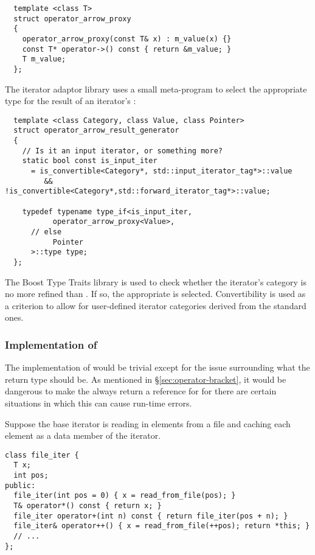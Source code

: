 \documentclass{netobjectdays}
\begin{document}
{\footnotesize
\begin{verbatim}
  template <class T>
  struct operator_arrow_proxy
  {
    operator_arrow_proxy(const T& x) : m_value(x) {}
    const T* operator->() const { return &m_value; }
    T m_value;
  };
\end{verbatim}
}

\noindent The iterator adaptor library uses a small meta-program to
select the appropriate type for the result of an iterator's
:

{\footnotesize
\begin{verbatim}
  template <class Category, class Value, class Pointer>
  struct operator_arrow_result_generator
  {
    // Is it an input iterator, or something more?
    static bool const is_input_iter
      = is_convertible<Category*, std::input_iterator_tag*>::value
         && !is_convertible<Category*,std::forward_iterator_tag*>::value;

    typedef typename type_if<is_input_iter,
           operator_arrow_proxy<Value>,
      // else
           Pointer
      >::type type;
  };
\end{verbatim}
}

The Boost Type Traits library is used to check whether the iterator's
category is no more refined than . If so,
the appropriate  is selected.
Convertibility is used as a criterion to allow for user-defined
iterator categories derived from the standard ones.


\subsubsection{Implementation of }
\label{sec:op-bracket-impl}

The implementation of  would be trivial except for
the issue surrounding what the return type should be.  As mentioned in
\S\ref{sec:operator-bracket}, it would be dangerous to make the
 always return a reference for
 for there are certain situations in which this can
cause run-time errors.

Suppose the base iterator is reading in elements from a file and
caching each element as a data member of the iterator.

{\footnotesize
\begin{verbatim}
class file_iter {
  T x;
  int pos;
public:
  file_iter(int pos = 0) { x = read_from_file(pos); }
  T& operator*() const { return x; }
  file_iter operator+(int n) const { return file_iter(pos + n); }
  file_iter& operator++() { x = read_from_file(++pos); return *this; }
  // ...
};
\end{verbatim}
}
\end{document}
